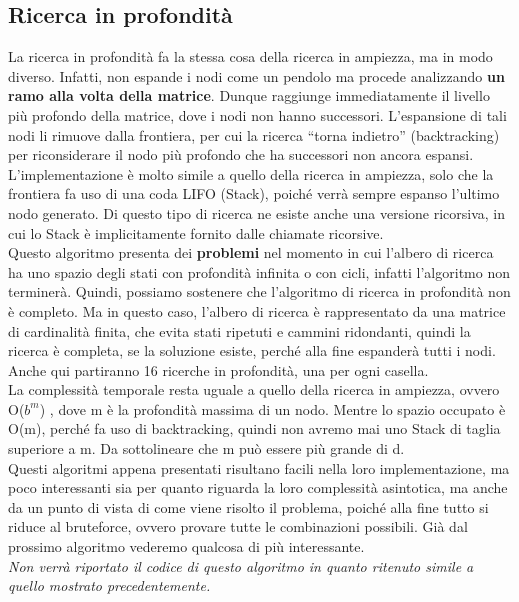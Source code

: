 \documentclass[10pt,a4paper]{article}
\begin{document}
	\subsection{Ricerca in profondità}
	La ricerca in profondità fa la stessa cosa della ricerca in ampiezza, ma in modo diverso. Infatti, non espande i nodi come un pendolo ma procede analizzando \textbf{un ramo alla volta della matrice}. Dunque raggiunge immediatamente il livello più profondo della matrice, dove i nodi non hanno successori. L’espansione di tali nodi li rimuove dalla frontiera, per cui la ricerca “torna indietro” (backtracking) per riconsiderare il nodo più profondo che ha successori non ancora espansi. L'implementazione è molto simile a quello della ricerca in ampiezza, solo che la frontiera fa uso di una coda LIFO (Stack), poiché verrà sempre espanso l’ultimo nodo generato. Di questo tipo di ricerca ne esiste anche una versione ricorsiva, in cui lo Stack è implicitamente fornito dalle chiamate ricorsive.\\
	Questo algoritmo presenta dei \textbf{problemi} nel momento in cui l’albero di ricerca ha uno spazio degli stati con profondità infinita o con cicli, infatti l’algoritmo non terminerà. Quindi, possiamo sostenere che l’algoritmo di ricerca in profondità non è completo.
	Ma in questo caso, l'albero di ricerca è rappresentato da una matrice di cardinalità finita, che evita stati ripetuti e cammini ridondanti, quindi la ricerca è completa, se la soluzione esiste, perché alla fine espanderà tutti i nodi.\\
	Anche qui partiranno 16 ricerche in profondità, una per ogni casella.\\
	La complessità temporale resta uguale a quello della ricerca in ampiezza, ovvero O($b^m$) , dove m è la profondità massima di un nodo. Mentre lo spazio occupato è O(m), perché fa uso di backtracking, quindi non avremo mai uno Stack di taglia superiore a m. Da sottolineare che m può essere più grande di d.\\
	Questi algoritmi appena presentati risultano facili nella loro implementazione, ma poco interessanti sia per quanto riguarda la loro complessità asintotica, ma anche da un punto di vista di come viene risolto il problema, poiché alla fine tutto si riduce al bruteforce, ovvero provare tutte le combinazioni possibili. Già dal prossimo algoritmo vederemo qualcosa di più interessante.\\
	\small{\textit{Non verrà riportato il codice di questo algoritmo in quanto ritenuto simile a quello mostrato precedentemente.}}\\
\end{document}
